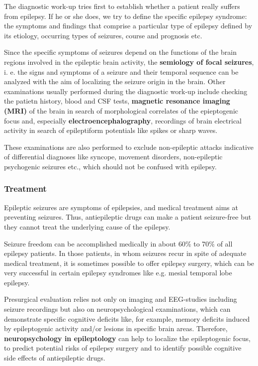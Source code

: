 \documentclass[12pt,article,oneside,a4paper]{memoir}
\begin{document}
The diagnostic work-up tries first to establish whether a patient really suffers from epilepsy. If he or she does, we try to define the specific epilepsy syndrome: the symptoms and findings that comprise a particular type of epilepsy defined by its etiology, occurring types of seizures, course and prognosis etc.

Since the specific symptoms of seizures depend on the functions of the brain regions involved in the epileptic brain activity, the \textbf{semiology of focal seizures}, i. e. the signs and symptoms of a seizure and their temporal sequence can be analyzed with the aim of localizing the seizure origin in the brain.
Other examinations usually performed during the diagnostic work-up include checking the patietn history, blood and CSF tests, \textbf{magnetic resonance imaging (MRI)} of the brain in search of morphological correlates of the epieptogenic focus and, especially \textbf{electroencephalography}, recordings of brain electrical activity in search of epileptiform potentials like spikes or sharp waves.

These examinations are also performed to exclude non-epileptic attacks indicative of differential diagnoses like syncope, movement disorders, non-epileptic psychogenic seizures etc., which should not be confused with epilepsy.

\subsubsection{Treatment}

Epileptic seizures are symptoms of epilepsies, and medical treatment aims at preventing seizures. Thus, antiepileptic drugs can make a patient seizure-free but they cannot treat the underlying cause of the epilepsy. 

Seizure freedom can be accomplished medically in about 60\% to 70\% of all epilepsy patients. In those patients, in whom seizures recur in spite of adequate medical treatment, it is sometimes possible to offer epilepsy surgery, which can be very successful in certain epilepsy syndromes like e.g. mesial temporal lobe epilepsy.

Presurgical evaluation relies not only on imaging and EEG-studies including seizure recordings but also on neuropsychological examinations, which can demonstrate specific cognitive deficits like, for example, memory deficits induced by epileptogenic activity and/or lesions in specific brain areas. Therefore, \textbf{neuropsychology in epileptology} can help to localize the epileptogenic focus, to predict potential risks of epilepsy surgery and to identify possible cognitive side effects of antiepileptic drugs.
\end{document}
